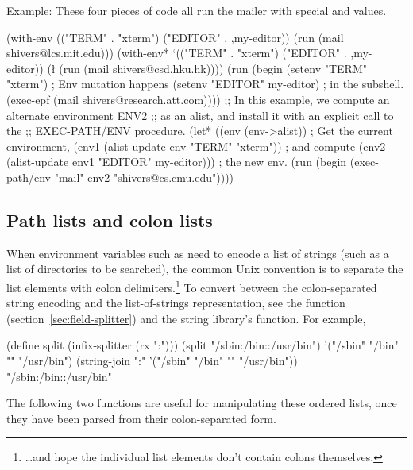 Example: These four pieces of code all run the mailer with special 
 and  values.
{\small
\begin{code}
(with-env (("TERM" . "xterm") ("EDITOR" . ,my-editor))
  (run (mail shivers@lcs.mit.edu)))
\cb
(with-env* `(("TERM" . "xterm") ("EDITOR" . ,my-editor))
  (\l{} (run (mail shivers@csd.hku.hk))))
\cb
(run (begin (setenv "TERM" "xterm")      ; Env mutation happens
            (setenv "EDITOR" my-editor) ; in the subshell.
            (exec-epf (mail shivers@research.att.com))))
\cb
;; In this example, we compute an alternate environment ENV2
;; as an alist, and install it with an explicit call to the
;; EXEC-PATH/ENV procedure.
(let* ((env (env->alist))           ; Get the current environment,
       (env1 (alist-update env  "TERM" "xterm"))      ; and compute
       (env2 (alist-update env1 "EDITOR" my-editor))) ; the new env.
  (run (begin (exec-path/env "mail" env2 "shivers@cs.cmu.edu"))))\end{code}}

\subsection{Path lists and colon lists}

When environment variables such as  need to encode a list of
strings (such as a list of directories to be searched), 
the common Unix convention is to separate the list elements with 
colon delimiters.\footnote{\ldots and hope the individual list elements 
don't contain colons themselves.}
To convert between the colon-separated string encoding and the
list-of-strings representation, see the  function
(section~\ref{sec:field-splitter}) and the string library's
 function.
For example,
\begin{code}
(define split (infix-splitter (rx ":")))
(split "/sbin:/bin::/usr/bin") {\evalsto} 
    '("/sbin" "/bin" "" "/usr/bin")
(string-join ":" '("/sbin" "/bin" "" "/usr/bin")) {\evalsto}
    "/sbin:/bin::/usr/bin"\end{code}
The following two functions are useful for manipulating these ordered lists,
once they have been parsed from their colon-separated form.

